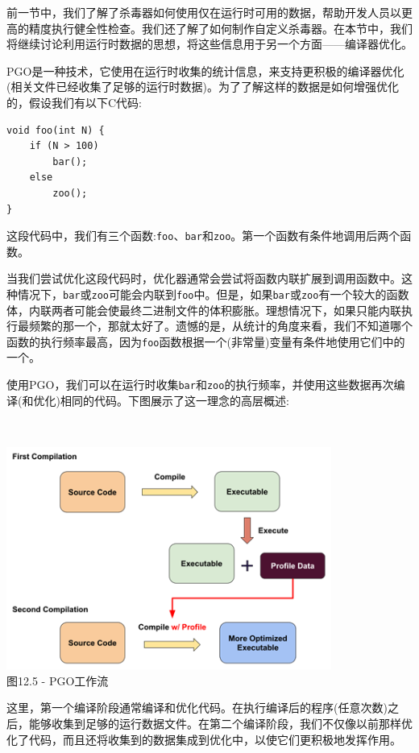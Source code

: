 
前一节中，我们了解了杀毒器如何使用仅在运行时可用的数据，帮助开发人员以更高的精度执行健全性检查。我们还了解了如何制作自定义杀毒器。在本节中，我们将继续讨论利用运行时数据的思想，将这些信息用于另一个方面——编译器优化。

PGO是一种技术，它使用在运行时收集的统计信息，来支持更积极的编译器优化(相关文件已经收集了足够的运行时数据)。为了了解这样的数据是如何增强优化的，假设我们有以下C代码:

\begin{lstlisting}[style=styleCXX]
void foo(int N) {
	if (N > 100)
		bar();
	else
		zoo();
}
\end{lstlisting}

这段代码中，我们有三个函数:\texttt{foo}、\texttt{bar}和\texttt{zoo}。第一个函数有条件地调用后两个函数。

当我们尝试优化这段代码时，优化器通常会尝试将函数内联扩展到调用函数中。这种情况下，\texttt{bar}或\texttt{zoo}可能会内联到\texttt{foo}中。但是，如果\texttt{bar}或\texttt{zoo}有一个较大的函数体，内联两者可能会使最终二进制文件的体积膨胀。理想情况下，如果只能内联执行最频繁的那一个，那就太好了。遗憾的是，从统计的角度来看，我们不知道哪个函数的执行频率最高，因为\texttt{foo}函数根据一个(非常量)变量有条件地使用它们中的一个。

使用PGO，我们可以在运行时收集\texttt{bar}和\texttt{zoo}的执行频率，并使用这些数据再次编译(和优化)相同的代码。下图展示了这一理念的高层概述:

\hspace*{\fill} \\ %
\begin{center}
\includegraphics[width=0.8\textwidth]{content/3/chapter12/images/5.png}\\
图12.5 - PGO工作流
\end{center}

这里，第一个编译阶段通常编译和优化代码。在执行编译后的程序(任意次数)之后，能够收集到足够的运行数据文件。在第二个编译阶段，我们不仅像以前那样优化了代码，而且还将收集到的数据集成到优化中，以使它们更积极地发挥作用。

